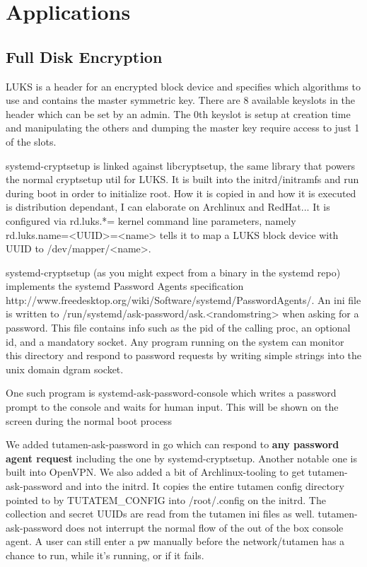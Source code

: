 \documentclass[letterpaper,twocolumn,10pt]{article}
\begin{document}




\section{Applications}
\label{sec:apps}

\subsection{Full Disk Encryption}

LUKS is a header for an encrypted block device and specifies which algorithms to
use and contains the master symmetric key. There are 8 available keyslots in
the header which can be set by an admin. The 0th keyslot is setup at creation
time and manipulating the others and dumping the master key require access to
just 1 of the slots.

systemd-cryptsetup is linked against libcryptsetup, the same library that powers
the normal cryptsetup util for LUKS. It is built into the initrd/initramfs and
run during boot in order to initialize root. How it is copied in and how it is
executed is distribution dependant, I can elaborate on Archlinux and RedHat...
It is configured via rd.luks.*= kernel command line parameters, namely
rd.luks.name=<UUID>=<name> tells it to map a LUKS block device with UUID to
/dev/mapper/<name>.

systemd-cryptsetup (as you might expect from a binary in the systemd repo)
implements the systemd Password Agents specification
http://www.freedesktop.org/wiki/Software/systemd/PasswordAgents/. An ini file
is written to /run/systemd/ask-password/ask.<randomstring> when asking for a
password. This file contains info such as the pid of the calling proc, an
optional id, and a mandatory socket. Any program running on the system can
monitor this directory and respond to password requests by writing simple
strings into the unix domain dgram socket.

One such program is systemd-ask-password-console which writes a password prompt
to the console and waits for human input. This will be shown on the screen
during the normal boot process

We added tutamen-ask-password in go which can respond to \textbf{any password
agent request} including the one by systemd-cryptsetup. Another notable one is
built into OpenVPN. We also added a bit of Archlinux-tooling to get
tutamen-ask-password and into the initrd. It copies the entire tutamen config
directory pointed to by TUTATEM\_CONFIG into /root/.config on the initrd. The
collection and secret UUIDs are read from the tutamen ini files as well.
tutamen-ask-password does not interrupt the normal flow of the out of the box
console agent. A user can still enter a pw manually before the network/tutamen
has a chance to run, while it's running, or if it fails.
\end{document}
